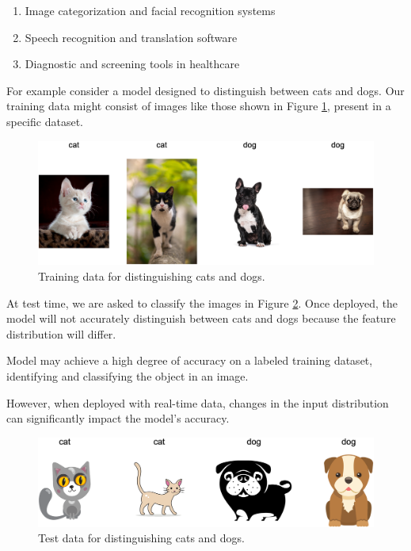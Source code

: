 	\begin{enumerate}
		\item Image categorization and facial recognition systems
		\item Speech recognition and translation software
		\item Diagnostic and screening tools in healthcare
	\end{enumerate}
	
For example consider a model designed to distinguish between cats and dogs. Our training data might consist of images like those shown in Figure \ref{fig:cani-gatti-tr}, present in a specific dataset.
	
	\vspace{1cm}
	\begin{figure}[H]
		\centering
		\includegraphics[width=1\textwidth]{assets/cat-dog-train.png} 
		\caption{Training data for distinguishing cats and dogs.}
		\label{fig:cani-gatti-tr}
	\end{figure}
     \vspace{1cm}
     

At test time, we are asked to classify the images in Figure \ref{fig:cani-gatti-ts}. Once deployed, the model will not accurately distinguish between cats and dogs because the feature distribution will differ.

Model may achieve a high degree of accuracy on a labeled training dataset, identifying and classifying the object in an image. 

However, when deployed with real-time data, changes in the input distribution can significantly impact the model's accuracy.
		
	\vspace{1cm}
	\begin{figure}[H]
		\centering
		\includegraphics[width=1\textwidth]{assets/cat-dog-test.png} 
		\caption{Test data for distinguishing cats and dogs.}
		\label{fig:cani-gatti-ts}
	\end{figure}
	\vspace{1cm}
	
